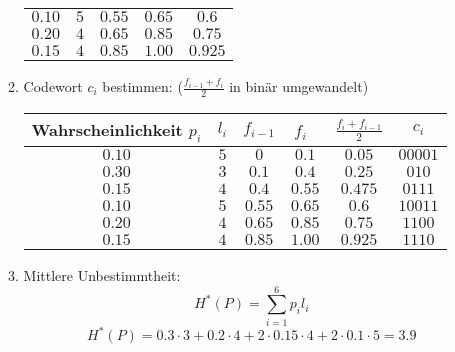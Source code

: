 \documentclass{scrreprt}
\begin{document}
\begin{uebsp}
\begin{Answer}
\begin{enumerate}[i)]
\begin{enumerate}[1)]
\begin{center}
\begin{tabular}{ccccc}
                        $0.10$ & $5$ & $0.55$ & $0.65$ & $0.6$\\
                        $0.20$ & $4$ & $0.65$ & $0.85$ & $0.75$\\
                        $0.15$ & $4$ & $0.85$ & $1.00$ & $0.925$\\
                        \hline
                    \end{tabular}
                \end{center}
            \item Codewort $c_i$ bestimmen: ($\frac{f_{i-1}+f_i}{2}$ in binär umgewandelt)
                 \begin{center}
                    \begin{tabular}{cccccc}
                        \hline
                        Wahrscheinlichkeit $p_i$&$l_i$ & $f_{i-1}$ & $f_{i}$\ & $\frac{f_i+f_{i-1}}{2}$ & $c_i$\\
                        \hline
                        $0.10$ & $5$ & $0$ & $0.1$ & $0.05$ & $00001$\\
                        $0.30$ & $3$ & $0.1$ & $0.4$ & $0.25$ & $010$\\
                        $0.15$ & $4$ & $0.4$ & $0.55$ & $0.475$ & $0111$\\
                        $0.10$ & $5$ & $0.55$ & $0.65$ & $0.6$ & $10011$\\
                        $0.20$ & $4$ & $0.65$ & $0.85$ & $0.75$ & $1100$\\
                        $0.15$ & $4$ & $0.85$ & $1.00$ & $0.925$ & $1110$\\
                        \hline
                    \end{tabular}
                \end{center}               
        \item Mittlere Unbestimmtheit:
            \[H^*(P)=\sum_{i=1}^6p_il_i\]
            \[H^*(P)=0.3\cdot 3+0.2\cdot 4+2\cdot 0.15\cdot 4+2\cdot 0.1\cdot 5=3.9\]
        \end{enumerate}
\end{enumerate}
\end{Answer}
\end{uebsp}
\end{document}
